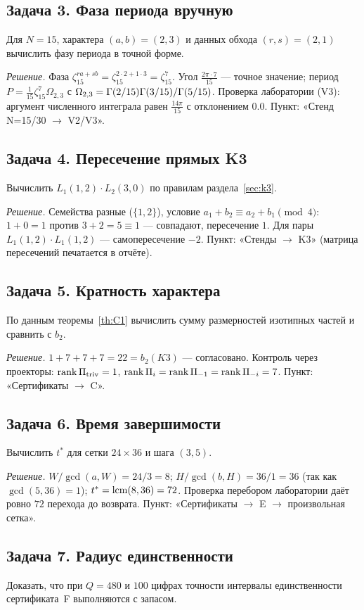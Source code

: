 \subsection*{Задача 3. Фаза периода вручную}
Для $N=15$, характера $(a,b)=(2,3)$ и данных обхода $(r,s)=(2,1)$
вычислить фазу периода в точной форме.

\emph{Решение.} Фаза $\zeta_{15}^{ra+sb}=\zeta_{15}^{2\cdot2+1
\cdot3}=\zeta_{15}^{7}$. Угол $\frac{2\pi\cdot7}{15}$ --- точное
значение; период $P=\frac1{15}\zeta_{15}^7\Omega_{2,3}$ с
$\Omega_{2,3}=\Gamma(2/15)\Gamma(3/15)/\Gamma(5/15)$. Проверка лаборатории
(V3): аргумент численного интеграла равен $\frac{14\pi}{15}$ с
отклонением $0.0$. Пункт: «Стенд N=15/30 $\to$ V2/V3».

\subsection*{Задача 4. Пересечение прямых K3}
Вычислить $L_1(1,2)\cdot L_2(3,0)$ по правилам
раздела~\ref{sec:k3}.

\emph{Решение.} Семейства разные ($\{1,2\}$), условие
$a_1+b_2\equiv a_2+b_1\pmod4$: $1+0=1$ против $3+2=5\equiv1$ ---
совпадают, пересечение $1$. Для пары $L_1(1,2)\cdot L_1(1,2)$ ---
самопересечение $-2$. Пункт: «Стенды $\to$ K3» (матрица
пересечений печатается в отчёте).

\subsection*{Задача 5. Кратность характера}
По данным теоремы~\ref{th:C1} вычислить сумму размерностей изотипных
частей и сравнить с $b_2$.

\emph{Решение.} $1+7+7+7=22=b_2(K3)$ --- согласовано. Контроль
через проекторы: $\operatorname{rank}\Pi_{\mathrm{triv}}=1$,
$\operatorname{rank}\Pi_{i}=\operatorname{rank}\Pi_{-1}=\operatorname{rank}\Pi_{-i}=7$. Пункт:
«Сертификаты $\to$ C».

\subsection*{Задача 6. Время завершимости}
Вычислить $t^*$ для сетки $24\times36$ и шага $(3,5)$.

\emph{Решение.} $W/\gcd(a,W)=24/3=8$; $H/\gcd(b,H)=36/1=36$
(так как $\gcd(5,36)=1$); $t^*=\operatorname{lcm}(8,36)=72$. Проверка перебором
лаборатории даёт ровно $72$ перехода до возврата. Пункт:
«Сертификаты $\to$ E $\to$ произвольная сетка».

\subsection*{Задача 7. Радиус единственности}
Доказать, что при $Q=480$ и $100$ цифрах точности интервалы
единственности сертификата~F выполняются с запасом.

